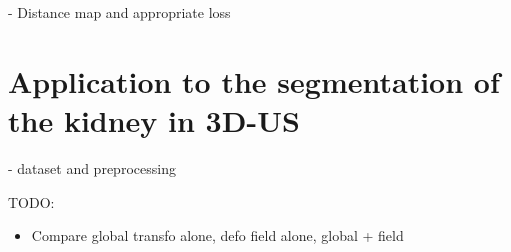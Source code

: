 - Distance map and appropriate loss

\section{Application to the segmentation of the kidney in 3D-US}

- dataset and preprocessing

TODO:
\begin{itemize}
    \item Compare global transfo alone, defo field alone, global + field
\end{itemize}


